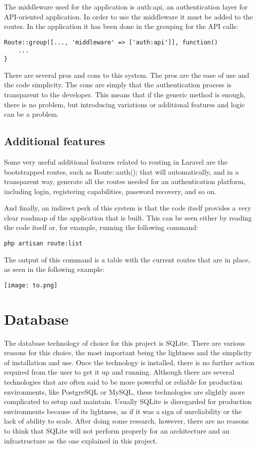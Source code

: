 The middleware used for the application is auth:api, an authentication layer for API-oriented application. In order to use the middleware it must be added to the routes. In the application it has been done in the grouping for the API calls:

\begin{verbatim}
Route::group([..., 'middleware' => ['auth:api']], function()
	...
}
\end{verbatim}

There are several pros and cons to this system. The pros are the ease of use and the code simplicity. The cons are simply that the authentication process is transparent to the developer. This means that if the generic method is enough, there is no problem, but introducing variations or additional features and logic can be a problem.

\subsection{Additional features}
Some very useful additional features related to routing in Laravel are the bootstrapped routes, such as Route::auth(); that will automatically, and in a transparent way, generate all the routes needed for an authentication platform, including login, registering capabilities, password recovery, and so on.

And finally, an indirect perk of this system is that the code itself provides a very clear roadmap of the application that is built. This can be seen either by reading the code itself or, for example, running the following command:

\begin{verbatim}
php artisan route:list
\end{verbatim}

The output of this command is a table with the current routes that are in place, as seen in the following example:

\texttt{[image: to.png]}

\section{Database}
The database technology of choice for this project is SQLite. There are various reasons for this choice, the most important being the lightness and the simplicity of installation and use. Once the technology is installed, there is no further action required from the user to get it up and running. Although there are several technologies that are often said to be more powerful or reliable for production environments, like PostgreSQL or MySQL, these technologies are slightly more complicated to setup and maintain. Usually SQLite is disregarded for production environments because of its lightness, as if it was a sign of unreliability or the lack of ability to scale. After doing some research, however, there are no reasons to think that SQLite will not perform properly for an architecture and an infrastructure as the one explained in this project.

